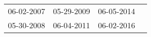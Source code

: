 \begin{supertabular}{llll}
 06-02-2007 &  05-29-2009 &  06-05-2014 \\
 05-30-2008 &  06-04-2011 &  06-02-2016 \\
\end{supertabular}

